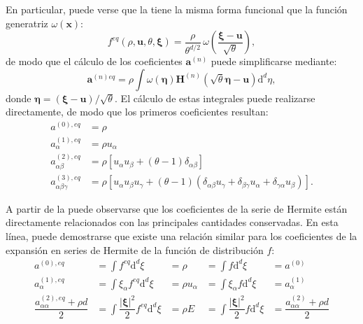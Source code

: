 En particular, puede verse que la \edf{} tiene la misma forma funcional que la funci\'on generatriz $\omega(\bm{x})$:
\begin{equation}
	f^{eq}(\rho, \bm{u}, \theta, \bm{\xi}) = \dfrac{\rho}{\theta^{d/2}} \, \omega \left( \dfrac{\bm{\xi} - \bm{u}}{\sqrt{\theta}} \right),
\end{equation}
de modo que el c\'alculo de los coeficientes $\bm{a}^{(n)}$ puede simplificarse mediante:
\begin{equation}
	\bm{a}^{(n)eq} = \rho \int \omega(\bm{\eta})\bm{H}^{(n)}(\sqrt{\theta}\bm{\eta} - \bm{u}) \mbox{d}^d \eta,
\end{equation}
donde $\bm{\eta} = (\bm{\xi} - \bm{u})/\sqrt{\theta}$. El c\'alculo de estas integrales puede realizarse directamente, de modo que los primeros coeficientes resultan:
\begin{subequations}
	\begin{align}
		a^{(0),eq}          &= \rho              \\ 
		a^{(1),eq}_{\alpha} &= \rho u_{\alpha}   \\
		a^{(2),eq}_{\alpha\beta} &= \rho \left[ u_{\alpha} u_{\beta} + (\theta-1)\delta_{\alpha\beta} \right]   \\
		a^{(3),eq}_{\alpha\beta\gamma} &= \rho \left[ u_{\alpha} u_{\beta} u_{\gamma} + (\theta-1)(\delta_{\alpha\beta}u_{\gamma} + \delta_{\beta\gamma}u_{\alpha} + \delta_{\gamma\alpha}u_{\beta}) \right].
	\end{align}
	\label{eq:eq_coeffs}
\end{subequations}

A partir de la  puede observarse que los coeficientes de la serie de Hermite est\'an directamente relacionados con las principales cantidades conservadas. En esta l\'inea, puede demostrarse que existe una relaci\'on similar para los coeficientes de la expansi\'on en series de Hermite de la funci\'on de distribuci\'on $f$:
\begin{subequations}
	\begin{align}
		a^{(0),eq} &= \int f^{eq} \mbox{d}^d \xi  &= \rho  &= \int f \mbox{d}^d \xi &= a^{(0)}   \\ 
		a^{(1),eq}_{\alpha} &= \int \xi_{\alpha}f^{eq} \mbox{d}^d \xi  &= \rho u_{\alpha}  &= \int \xi_{\alpha}f \mbox{d}^d \xi &= a^{(1)}_{\alpha}   \\ 		
		\dfrac{a^{(2),eq}_{\alpha\alpha}+\rho d}{2} &= \int \dfrac{|\bm{\xi}|^2}{2} f^{eq} \mbox{d}^d \xi  &= \rho E  &= \int \dfrac{|\bm{\xi}|^2}{2} f \mbox{d}^d \xi &= \dfrac{a^{(2)}_{\alpha\alpha}+\rho d}{2}
	\end{align}
\end{subequations}

